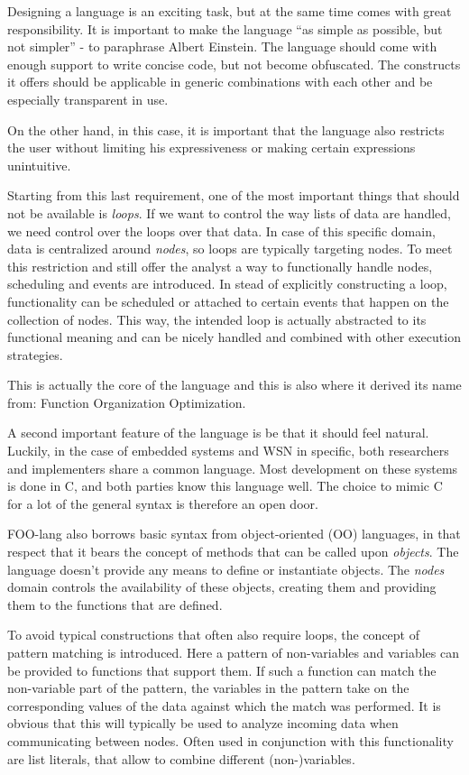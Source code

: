 \documentclass[conference]{IEEEtran}
\begin{document}
Designing a language is an exciting task, but at the same time comes with great
responsibility. It is important to make the language ``as simple as possible,
but not simpler'' - to paraphrase Albert Einstein. The language should come
with enough support to write concise code, but not become obfuscated. The
constructs it offers should be applicable in generic combinations with each
other and be especially transparent in use.

On the other hand, in this case, it is important that the language also
restricts the user without limiting his expressiveness or making certain
expressions unintuitive.

Starting from this last requirement, one of the most important things that
should not be available is \emph{loops}. If we want to control the way lists of
data are handled, we need control over the loops over that data. In case of
this specific domain, data is centralized around \emph{nodes}, so loops are
typically targeting nodes. To meet this restriction and still offer the analyst
a way to functionally handle nodes, scheduling and events are introduced. In
stead of explicitly constructing a loop, functionality can be scheduled or
attached to certain events that happen on the collection of nodes. This way,
the intended loop is actually abstracted to its functional meaning and can be
nicely handled and combined with other execution strategies.

This is actually the core of the language and this is also where it derived its
name from: Function Organization Optimization.

A second important feature of the language is be that it should feel natural.
Luckily, in the case of embedded systems and WSN in specific, both researchers
and implementers share a common language. Most development on these systems is
done in C, and both parties know this language well. The choice to mimic C for
a lot of the general syntax is therefore an open door.

FOO-lang also borrows basic syntax from object-oriented (OO) languages, in that
respect that it bears the concept of methods that can be called upon
\emph{objects}. The language doesn't provide any means to define or instantiate
objects. The \emph{nodes} domain controls the availability of these objects,
creating them and providing them to the functions that are defined.

To avoid typical constructions that often also require loops, the concept of
pattern matching is introduced. Here a pattern of non-variables and variables
can be provided to functions that support them. If such a function can match
the non-variable part of the pattern, the variables in the pattern take on the
corresponding values of the data against which the match was performed. It is
obvious that this will typically be used to analyze incoming data when
communicating between nodes. Often used in conjunction with this functionality
are list literals, that allow to combine different (non-)variables.
\end{document}
